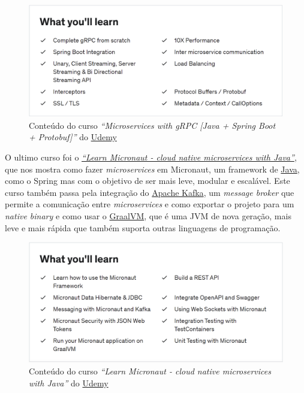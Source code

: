 \begin{figure}[!hbt]
  \centering
  \includegraphics[width=14cm]{figuras/udemy2.png}
  \caption{Conteúdo do curso \textit{``Microservices with gRPC [Java + Spring Boot + Protobuf]''} do \href{https://www.udemy.com/}{Udemy}}
  \label{fig:udemy2}
\end{figure}
\FloatBarrier

O ultimo curso foi o \href{https://www.udemy.com/course/learn-micronaut/}{\textit{``Learn Micronaut - cloud native microservices with Java''}}, que nos mostra como fazer \textit{microservices} em Micronaut, um framework de \href{https://jdk.java.net/}{Java}, como o Spring mas com o objetivo de ser mais leve, modular e escalável. Este curso também passa pela integração do \href{https://kafka.apache.org/}{Apache Kafka}, um \textit{message broker} que permite a comunicação entre \textit{microservices} e como exportar o projeto para um \textit{native binary} e como usar o \href{https://www.graalvm.org/}{GraalVM}, que é uma JVM de nova geração, mais leve e mais rápida que também suporta outras linguagens de programação.

\begin{figure}[!hbt]
  \centering
  \includegraphics[width=14cm]{figuras/udemy3.png}
  \caption{Conteúdo do curso \textit{``Learn Micronaut - cloud native microservices with Java''} do \href{https://www.udemy.com/}{Udemy}}
  \label{fig:udemy3}
\end{figure}
\FloatBarrier